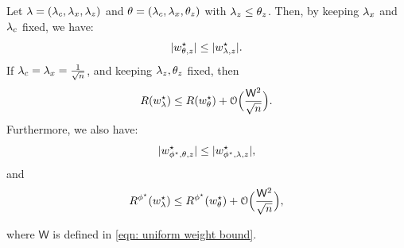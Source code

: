 \begin{lem}\label{lem: inverse relation between regulariser and risk}
    Let $\lambda = (\lambda_c,\lambda_x,\lambda_z)$ and $\theta = (\lambda_c,\lambda_x,\theta_z)$ with $\lambda_z \leq \theta_z$. Then, by keeping $\lambda_x$ and $\lambda_c$ fixed, we have:
    \begin{equation}\label{eqn: inverse relation between regulariser and risk z weight}
        |w^\star_{\theta,z}| \leq |w^\star_{{\lambda,z}}|.
    \end{equation}
    If $\lambda_c = \lambda_x = \frac{1}{\sqrt{n}}$, and keeping $\lambda_z, \theta_z$ fixed, then
    \begin{equation}\label{eqn: inverse relation between regulariser and risk z}
        R(w^\star_{\lambda}) \leq R(w^\star_{\theta}) + \mathcal{O}\Big(\frac{\mathsf{W}^2}{\sqrt{n}}\Big).
    \end{equation}
    Furthermore, we also have:
    \begin{equation}\label{eqn: inverse relation between regulariser and risk phi star weight}
        |w^\star_{\phi^\star,\theta,z}| \leq |w^\star_{\phi^\star,\lambda,z}|,
    \end{equation}
    and
    \begin{equation}\label{eqn: inverse relation between regulariser and risk phi star}
        R^{\phi^\star}(w^\star_{\lambda}) \leq R^{\phi^\star}(w^\star_{\theta}) + \mathcal{O}\Big(\frac{\mathsf{W}^2}{\sqrt{n}}\Big),
    \end{equation}
\end{lem}
where $\mathsf{W}$ is defined in \eqref{eqn: uniform weight bound}.
